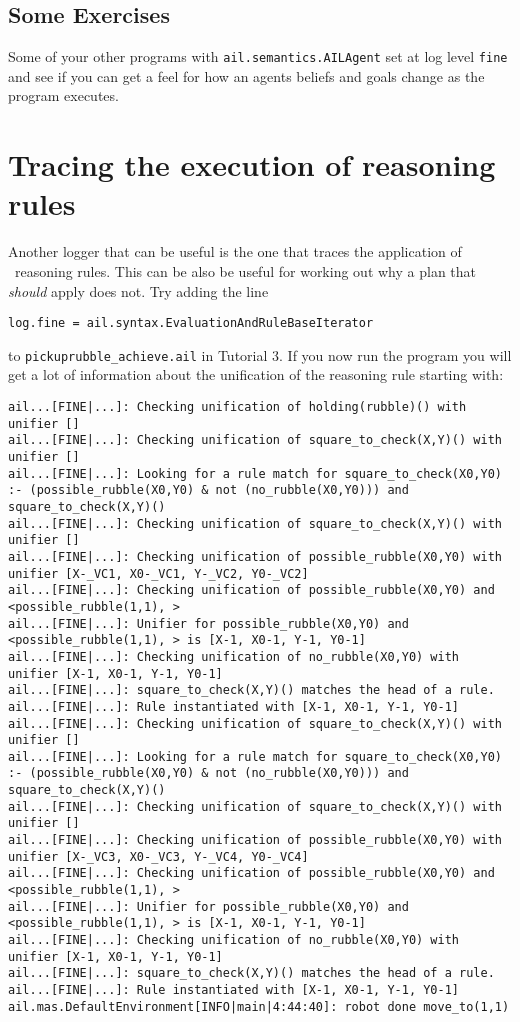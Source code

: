 \documentclass[a4]{article}
\begin{document}
\subsection{Some Exercises}
Some of your other programs with \texttt{ail.semantics.AILAgent} set at log level \texttt{fine} and see if you can get a feel for how an agents beliefs and goals change as the program executes.

\section{Tracing the execution of reasoning rules}
Another logger that can be useful is the one that traces the application of \prolog\ reasoning rules.  This can be also be useful for working out why a plan that \emph{should} apply does not.  Try adding the line
\begin{verbatim}
log.fine = ail.syntax.EvaluationAndRuleBaseIterator
\end{verbatim}
to \texttt{pickuprubble\_achieve.ail} in Tutorial 3.  If you now run the program you will get a lot of information about the unification of the reasoning rule starting with:

\begin{small}
\begin{verbatim}
ail...[FINE|...]: Checking unification of holding(rubble)() with unifier [] 
ail...[FINE|...]: Checking unification of square_to_check(X,Y)() with unifier [] 
ail...[FINE|...]: Looking for a rule match for square_to_check(X0,Y0) :- (possible_rubble(X0,Y0) & not (no_rubble(X0,Y0))) and square_to_check(X,Y)() 
ail...[FINE|...]: Checking unification of square_to_check(X,Y)() with unifier [] 
ail...[FINE|...]: Checking unification of possible_rubble(X0,Y0) with unifier [X-_VC1, X0-_VC1, Y-_VC2, Y0-_VC2] 
ail...[FINE|...]: Checking unification of possible_rubble(X0,Y0) and <possible_rubble(1,1), > 
ail...[FINE|...]: Unifier for possible_rubble(X0,Y0) and <possible_rubble(1,1), > is [X-1, X0-1, Y-1, Y0-1] 
ail...[FINE|...]: Checking unification of no_rubble(X0,Y0) with unifier [X-1, X0-1, Y-1, Y0-1] 
ail...[FINE|...]: square_to_check(X,Y)() matches the head of a rule. 
ail...[FINE|...]: Rule instantiated with [X-1, X0-1, Y-1, Y0-1] 
ail...[FINE|...]: Checking unification of square_to_check(X,Y)() with unifier [] 
ail...[FINE|...]: Looking for a rule match for square_to_check(X0,Y0) :- (possible_rubble(X0,Y0) & not (no_rubble(X0,Y0))) and square_to_check(X,Y)() 
ail...[FINE|...]: Checking unification of square_to_check(X,Y)() with unifier [] 
ail...[FINE|...]: Checking unification of possible_rubble(X0,Y0) with unifier [X-_VC3, X0-_VC3, Y-_VC4, Y0-_VC4] 
ail...[FINE|...]: Checking unification of possible_rubble(X0,Y0) and <possible_rubble(1,1), > 
ail...[FINE|...]: Unifier for possible_rubble(X0,Y0) and <possible_rubble(1,1), > is [X-1, X0-1, Y-1, Y0-1] 
ail...[FINE|...]: Checking unification of no_rubble(X0,Y0) with unifier [X-1, X0-1, Y-1, Y0-1] 
ail...[FINE|...]: square_to_check(X,Y)() matches the head of a rule. 
ail...[FINE|...]: Rule instantiated with [X-1, X0-1, Y-1, Y0-1] 
ail.mas.DefaultEnvironment[INFO|main|4:44:40]: robot done move_to(1,1) 
\end{verbatim}
\end{small}
\end{document}
